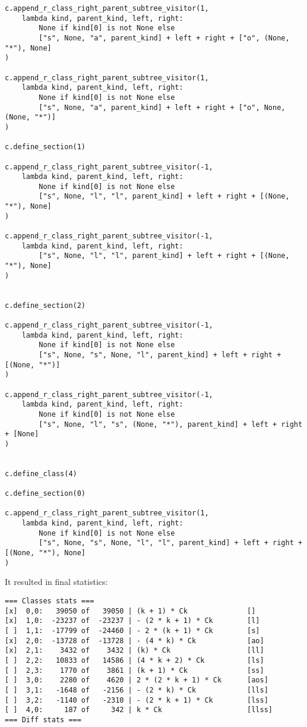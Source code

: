 \documentclass[final]{article}
\theoremstyle{definition}
\theoremstyle{remark}
\begin{document}
\begin{lstlisting}
c.append_r_class_right_parent_subtree_visitor(1,
    lambda kind, parent_kind, left, right:
        None if kind[0] is not None else
        ["s", None, "a", parent_kind] + left + right + ["o", (None, "*"), None]
)

c.append_r_class_right_parent_subtree_visitor(1,
    lambda kind, parent_kind, left, right:
        None if kind[0] is not None else
        ["s", None, "a", parent_kind] + left + right + ["o", None, (None, "*")]
)

c.define_section(1)

c.append_r_class_right_parent_subtree_visitor(-1,
    lambda kind, parent_kind, left, right:
        None if kind[0] is not None else
        ["s", None, "l", "l", parent_kind] + left + right + [(None, "*"), None]
)

c.append_r_class_right_parent_subtree_visitor(-1,
    lambda kind, parent_kind, left, right:
        ["s", None, "l", "l", parent_kind] + left + right + [(None, "*"), None]
)


c.define_section(2)

c.append_r_class_right_parent_subtree_visitor(-1,
    lambda kind, parent_kind, left, right:
        None if kind[0] is not None else
        ["s", None, "s", None, "l", parent_kind] + left + right + [(None, "*")]
)

c.append_r_class_right_parent_subtree_visitor(-1,
    lambda kind, parent_kind, left, right:
        None if kind[0] is not None else
        ["s", None, "l", "s", (None, "*"), parent_kind] + left + right + [None]
)


c.define_class(4)

c.define_section(0)

c.append_r_class_right_parent_subtree_visitor(1,
    lambda kind, parent_kind, left, right:
        None if kind[0] is not None else
        ["s", None, "s", None, "l", "l", parent_kind] + left + right + [(None, "*"), None]
)
\end{lstlisting}

It resulted in final statistics:

\begin{lstlisting}
=== Classes stats ===
[x]  0,0:   39050 of   39050 | (k + 1) * Ck              []
[x]  1,0:  -23237 of  -23237 | - (2 * k + 1) * Ck        [l]
[ ]  1,1:  -17799 of  -24460 | - 2 * (k + 1) * Ck        [s]
[x]  2,0:  -13728 of  -13728 | - (4 * k) * Ck            [ao]
[x]  2,1:    3432 of    3432 | (k) * Ck                  [ll]
[ ]  2,2:   10833 of   14586 | (4 * k + 2) * Ck          [ls]
[ ]  2,3:    1770 of    3861 | (k + 1) * Ck              [ss]
[ ]  3,0:    2280 of    4620 | 2 * (2 * k + 1) * Ck      [aos]
[ ]  3,1:   -1648 of   -2156 | - (2 * k) * Ck            [lls]
[ ]  3,2:   -1140 of   -2310 | - (2 * k + 1) * Ck        [lss]
[ ]  4,0:     187 of     342 | k * Ck                    [llss]
=== Diff stats ===
\end{lstlisting}
\end{document}
